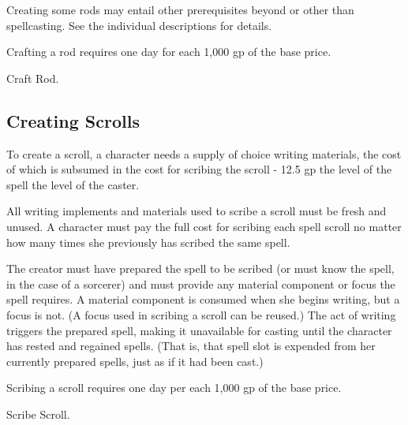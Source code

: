 Creating some rods may entail other prerequisites beyond or other than spellcasting. See the individual descriptions for details.

Crafting a rod requires one day for each 1,000 gp of the base price.

 Craft Rod.

\subsection{Creating Scrolls}

To create a scroll, a character needs a supply of choice writing materials, the cost of which is subsumed in the cost for scribing the scroll - 12.5 gp \mtimes the level of the spell \mtimes the level of the caster.

All writing implements and materials used to scribe a scroll must be fresh and unused. A character must pay the full cost for scribing each spell scroll no matter how many times she previously has scribed the same spell.

The creator must have prepared the spell to be scribed (or must know the spell, in the case of a sorcerer) and must provide any material component or focus the spell requires. A material component is consumed when she begins writing, but a focus is not. (A focus used in scribing a scroll can be reused.) The act of writing triggers the prepared spell, making it unavailable for casting until the character has rested and regained spells. (That is, that spell slot is expended from her currently prepared spells, just as if it had been cast.)

Scribing a scroll requires one day per each 1,000 gp of the base price.

 Scribe Scroll.

